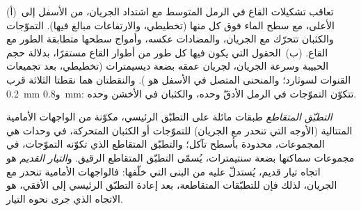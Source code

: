 \begin{omfigure}

{\small (أ)~تعاقب تشكيلات القاع في الرمل المتوسط مع اشتداد الجريان، من الأسفل إلى الأعلى، مع سطح الماء فوق كل منها (تخطيطي، والارتفاعات مبالغ فيها). التموّجات والكثبان تتحرّك مع الجريان، والمضادات عكسه، وأمواج سطحها متطابقة الطور مع القاع. (ب)~الحقول التي يكون فيها كل طور من أطوار القاع مستقرًا، بدلالة حجم الحبيبة وسرعة الجريان، لجريان عمقه بضعة ديسيمترات (تخطيطي، بعد تجميعات القنوات لسوثارد؛ والمنحنى المتصل في الأسفل هو ). والنقطتان هما نقطتا الثلاثة قرب \qty{0.2}{mm} و\qty{0.8}{mm}: تتكوّن التموّجات في الرمل الأدقّ وحده، والكثبان في الأخشن وحده.}
\label{fig:b1:clastic-sediments:bed-phases}
\end{omfigure}

\begin{definition}\label{def:b1:clastic-sediments:cross-bedding}
\emph{التطبّق المتقاطع} طبقات مائلة على التطبّق الرئيسي، مكوّنة من الواجهات الأمامية المتتالية (الأوجه التي تنحدر مع الجريان) للتموّجات أو الكثبان المتحركة، في وحدات هي المجموعات، محدودة بأسطح تآكل؛ والتطبّق المتقاطع الذي تكوّنه التموّجات، في مجموعات سماكتها بضعة سنتيمترات، يُسمّى التطبّق المتقاطع الرقيق. و\emph{التيار القديم} هو اتجاه تيار قديم، يُستدلّ عليه من البنى التي خلّفها: فالواجهات الأمامية تنحدر مع الجريان، لذلك فإن  للتطبّقات المتقاطعة، بعد إعادة التطبّق الرئيسي إلى الأفقي، هو الاتجاه الذي جرى نحوه التيار.
\end{definition}

